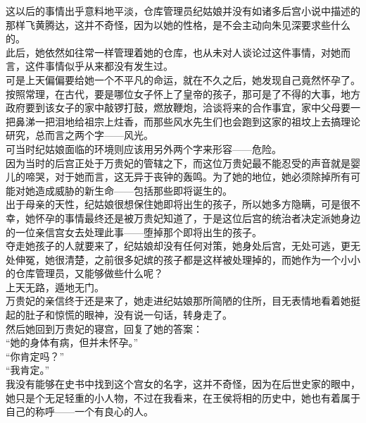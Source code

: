 \begin{multicols}{\theparacolNo}
这以后的事情出乎意料地平淡，仓库管理员纪姑娘并没有如诸多后宫小说中描述的那样飞黄腾达，这并不奇怪，因为以她的性格，是不会主动向朱见深要求些什么的。\\

此后，她依然如往常一样管理着她的仓库，也从未对人谈论过这件事情，对她而言，这件事情似乎从来都没有发生过。\\

可是上天偏偏要给她一个不平凡的命运，就在不久之后，她发现自己竟然怀孕了。\\

按照常理，在古代，要是哪位女子怀上了皇帝的孩子，那可是了不得的大事，地方政府要到该女子的家中敲锣打鼓，燃放鞭炮，洽谈将来的合作事宜，家中父母要一把鼻涕一把泪地给祖宗上炷香，而那些风水先生们也会跑到这家的祖坟上去搞理论研究，总而言之两个字——风光。\\

可当时纪姑娘面临的环境则应该用另外两个字来形容——危险。\\

因为当时的后宫正处于万贵妃的管辖之下，而这位万贵妃最不能忍受的声音就是婴儿的啼哭，对于她而言，这无异于丧钟的轰鸣。为了她的地位，她必须除掉所有可能对她造成威胁的新生命——包括那些即将诞生的。\\

出于母亲的天性，纪姑娘很想保住她即将出生的孩子，所以她多方隐瞒，可是很不幸，她怀孕的事情最终还是被万贵妃知道了，于是这位后宫的统治者决定派她身边的一位亲信宫女去处理此事——堕掉那个即将出生的孩子。\\

夺走她孩子的人就要来了，纪姑娘却没有任何对策，她身处后宫，无处可逃，更无处伸冤，她很清楚，之前很多妃嫔的孩子都是这样被处理掉的，而她作为一个小小的仓库管理员，又能够做些什么呢？\\

上天无路，遁地无门。\\

万贵妃的亲信终于还是来了，她走进纪姑娘那所简陋的住所，目无表情地看着她挺起的肚子和惊慌的眼神，没有说一句话，转身走了。\\

然后她回到万贵妃的寝宫，回复了她的答案：\\

“她的身体有病，但并未怀孕。”\\

“你肯定吗？”\\

“我肯定。”\\

我没有能够在史书中找到这个宫女的名字，这并不奇怪，因为在后世史家的眼中，她只是个无足轻重的小人物，不过在我看来，在王侯将相的历史中，她也有着属于自己的称呼——一个有良心的人。\\


\end{multicols}
